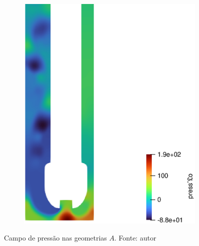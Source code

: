 \begin{figure}[H]
\begin{subfigure}[b]{0.42\linewidth}
    		\includegraphics[width=\linewidth]{img/campo_press/liso/campo_de_pres_standoff_paraview.eps}
    	\end{subfigure}
    	\caption{Campo de pressão nas geometrias $A$. Fonte: autor}
    	\label{fig:cpressaoA1A2}
\end{figure}
    

